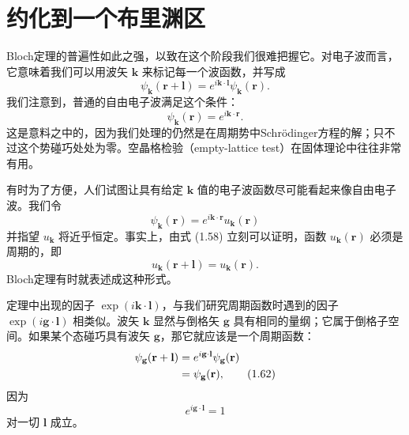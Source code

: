 \section{约化到一个布里渊区}

Bloch定理的普遍性如此之强，以致在这个阶段我们很难把握它。对电子波而言，它意味着我们可以用波矢 $\mathbf{k}$ 来标记每一个波函数，并写成
\begin{equation*}
\psi_{\mathbf{k}}(\mathbf{r}+\mathbf{l})=e^{i\mathbf{k}\cdot\mathbf{l}}\psi_{\mathbf{k}}(\mathbf{r}).
\tag{1.58}
\end{equation*}
我们注意到，普通的自由电子波满足这个条件：
\begin{equation*}
\psi_{\mathbf{k}}(\mathbf{r})=e^{i\mathbf{k}\cdot\mathbf{r}}.
\tag{1.59}
\end{equation*}
这是意料之中的，因为我们处理的仍然是在周期势中Schrödinger方程的解；只不过这个势碰巧处处为零。空晶格检验（empty-lattice test）在固体理论中往往非常有用。

有时为了方便，人们试图让具有给定 $\mathbf{k}$ 值的电子波函数尽可能看起来像自由电子波。我们令
\begin{equation*}
\psi_{\mathbf{k}}(\mathbf{r})=e^{i\mathbf{k}\cdot\mathbf{r}}u_{\mathbf{k}}(\mathbf{r})
\tag{1.60}
\end{equation*}
并指望 $u_{\mathbf{k}}$ 将近乎恒定。事实上，由式 (1.58) 立刻可以证明，函数 $u_{\mathbf{k}}(\mathbf{r})$ 必须是周期的，即
\begin{equation*}
u_{\mathbf{k}}(\mathbf{r}+\mathbf{l})=u_{\mathbf{k}}(\mathbf{r}).
\tag{1.61}
\end{equation*}
Bloch定理有时就表述成这种形式。

定理中出现的因子 $\exp(i\mathbf{k}\cdot\mathbf{l})$，与我们研究周期函数时遇到的因子 $\exp(i\mathbf{g}\cdot\mathbf{l})$ 相类似。波矢 $\mathbf{k}$ 显然与倒格矢 $\mathbf{g}$ 具有相同的量纲；它属于倒格子空间。如果某个态碰巧具有波矢 $\mathbf{g}$，那它就应该是一个周期函数：
\begin{align*}
\psi_{\mathbf{g}}(\mathbf{r}+\mathbf{l})&=e^{i\mathbf{g}\cdot\mathbf{l}}\psi_{\mathbf{g}}(\mathbf{r})\notag\\
&=\psi_{\mathbf{g}}(\mathbf{r}),
\tag{1.62}
\end{align*}
因为
\begin{equation*}
e^{i\mathbf{g}\cdot\mathbf{l}}=1
\tag{1.63}
\end{equation*}
对一切 $\mathbf{l}$ 成立。

